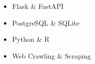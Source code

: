 \begin{itemize}
    \item Flask \& FastAPI
    \item PostgreSQL \& SQLite
    \item Python \& R
    \item Web Crawling \& Scraping
\end{itemize}